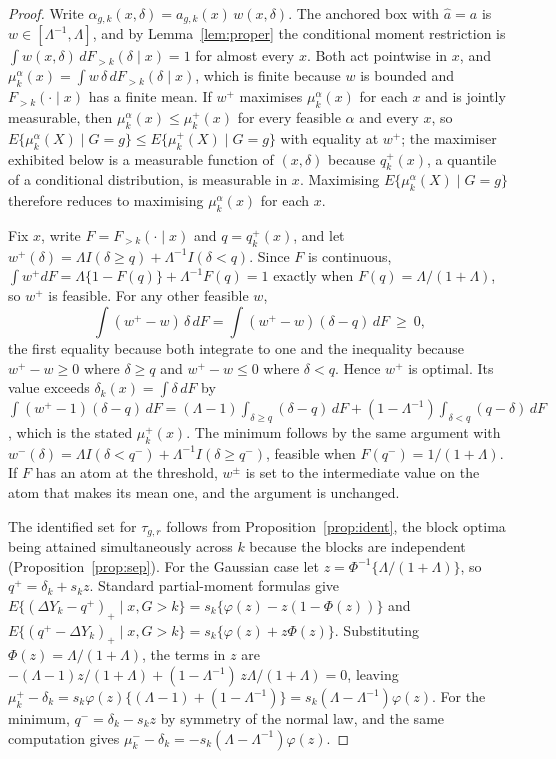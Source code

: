 \documentclass[12pt]{article}
\theoremstyle{remark}
\begin{document}
\begin{proof}
Write $\alpha_{g,k}(x,\delta) = a_{g,k}(x)\,w(x,\delta)$. The anchored box with
$\widehat a = a$ is $w \in [\Lambda^{-1}, \Lambda]$, and by Lemma~\ref{lem:proper} the
conditional moment restriction is $\int w(x,\delta)\,dF_{>k}(\delta \mid x) = 1$ for
almost every $x$. Both act pointwise in $x$, and $\mu^{\alpha}_k(x) = \int w\,\delta\,
dF_{>k}(\delta \mid x)$, which is finite because $w$ is bounded and $F_{>k}(\cdot \mid x)$
has a finite mean. If $w^{+}$ maximises $\mu^{\alpha}_k(x)$ for each $x$ and is jointly
measurable, then $\mu^{\alpha}_k(x) \le \mu^{+}_k(x)$ for every feasible $\alpha$ and
every $x$, so $E\{\mu^{\alpha}_k(X) \mid G{=}g\} \le E\{\mu^{+}_k(X) \mid G{=}g\}$ with
equality at $w^{+}$; the maximiser exhibited below is a measurable function of
$(x,\delta)$ because $q^{+}_k(x)$, a quantile of a conditional distribution, is measurable
in $x$. Maximising $E\{\mu^{\alpha}_k(X) \mid G{=}g\}$ therefore reduces to maximising
$\mu^{\alpha}_k(x)$ for each $x$.

Fix $x$, write $F = F_{>k}(\cdot \mid x)$ and $q = q^{+}_k(x)$, and let
$w^{+}(\delta) = \Lambda I(\delta \ge q) + \Lambda^{-1} I(\delta < q)$. Since $F$ is
continuous, $\int w^{+} dF = \Lambda\{1 - F(q)\} + \Lambda^{-1}F(q) = 1$ exactly when
$F(q) = \Lambda/(1{+}\Lambda)$, so $w^{+}$ is feasible. For any other feasible $w$,
\[
\int (w^{+} - w)\,\delta\, dF = \int (w^{+} - w)(\delta - q)\, dF \ \ge\ 0,
\]
the first equality because both integrate to one and the inequality because
$w^{+} - w \ge 0$ where $\delta \ge q$ and $w^{+} - w \le 0$ where $\delta < q$. Hence
$w^{+}$ is optimal. Its value exceeds $\delta_k(x) = \int \delta\, dF$ by
$\int (w^{+} - 1)(\delta - q)\, dF = (\Lambda{-}1)\int_{\delta \ge q}(\delta - q)\,dF +
(1{-}\Lambda^{-1})\int_{\delta < q}(q - \delta)\,dF$, which is the stated $\mu^{+}_k(x)$.
The minimum follows by the same argument with $w^{-}(\delta) = \Lambda I(\delta < q^{-}) +
\Lambda^{-1} I(\delta \ge q^{-})$, feasible when $F(q^{-}) = 1/(1{+}\Lambda)$. If $F$ has an
atom at the threshold, $w^{\pm}$ is set to the intermediate value on the atom that makes
its mean one, and the argument is unchanged.

The identified set for $\tau_{g,r}$ follows from Proposition~\ref{prop:ident}, the block
optima being attained simultaneously across $k$ because the blocks are independent
(Proposition~\ref{prop:sep}). For the Gaussian case let $z = \Phi^{-1}\{\Lambda/(1{+}\Lambda)\}$,
so $q^{+} = \delta_k + s_k z$. Standard partial-moment formulas give
$E\{(\Delta Y_k - q^{+})_+ \mid x, G{>}k\} = s_k\{\varphi(z) - z(1 - \Phi(z))\}$ and
$E\{(q^{+} - \Delta Y_k)_+ \mid x, G{>}k\} = s_k\{\varphi(z) + z\Phi(z)\}$. Substituting
$\Phi(z) = \Lambda/(1{+}\Lambda)$, the terms in $z$ are
$-(\Lambda{-}1)z/(1{+}\Lambda) + (1{-}\Lambda^{-1})\,z\Lambda/(1{+}\Lambda) = 0$, leaving
$\mu^{+}_k - \delta_k = s_k\varphi(z)\{(\Lambda{-}1) + (1{-}\Lambda^{-1})\} =
s_k(\Lambda - \Lambda^{-1})\varphi(z)$. For the minimum, $q^{-} = \delta_k - s_k z$ by
symmetry of the normal law, and the same computation gives $\mu^{-}_k - \delta_k =
-s_k(\Lambda - \Lambda^{-1})\varphi(z)$.
\end{proof}
\end{document}

